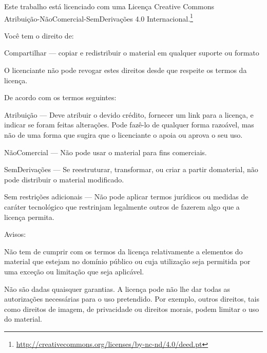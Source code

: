 \cleartorecto
\thispagestyle{chapter}
{\copyrightsize\setlength{\parindent}{0pt}%
\raggedright\label{copyright-details}
\setlength{\parskip}{7pt}

{\centering

{\LARGE\ccbyncnd}

Este trabalho está licenciado com uma Licença Creative Commons\\
Atribuição-NãoComercial-SemDerivações 4.0 Internacional.\footnote{%
\href{http://creativecommons.org/licenses/by-nc-nd/4.0/deed.pt}{http://creativecommons.org/licenses/by-nc-nd/4.0/deed.pt}}

}

Você tem o direito de:

\begin{packeditemize}
\item Compartilhar — copiar e redistribuir o material em qualquer suporte ou formato
\end{packeditemize}

O licenciante não pode revogar estes direitos desde que respeite os termos da licença.

De acordo com os termos seguintes:

\begin{packeditemize}
\item Atribuição — Deve atribuir o devido crédito, fornecer um link para a licença, e indicar se foram feitas alterações. Pode fazê-lo de qualquer forma razoável, mas não de uma forma que sugira que o licenciante o apoia ou aprova o seu uso.
\item NãoComercial — Não pode usar o material para fins comerciais.
\item SemDerivações — Se reestruturar, transformar, ou criar a partir domaterial, não pode distribuir o material modificado.
\end{packeditemize}

Sem restrições adicionais — Não pode aplicar termos jurídicos ou medidas de caráter tecnológico que restrinjam legalmente outros de fazerem algo que a licença permita.

Avisos:

Não tem de cumprir com os termos da licença relativamente a elementos do material que estejam no domínio público ou cuja utilização seja permitida por uma exceção ou limitação que seja aplicável.

Não são dadas quaisquer garantias. A licença pode não lhe dar todas as autorizações necessárias para o uso pretendido. Por exemplo, outros direitos, tais como direitos de imagem, de privacidade ou direitos morais, podem limitar o uso do material.


% 
% 

}
